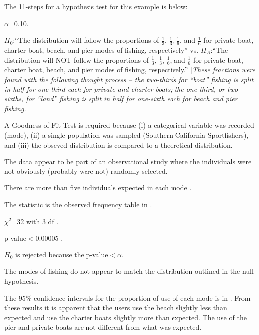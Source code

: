 \documentclass[10pt,openany]{book}\usepackage[]{graphicx}\usepackage[]{color}
\begin{document}
The 11-steps  for a hypothesis test for this example is below:
\begin{Enumerate}
  \item $\alpha$=0.10.
  \item $H_{0}$:``The distribution will follow the proportions of $\frac{1}{3}$, $\frac{1}{3}$, $\frac{1}{6}$, and $\frac{1}{6}$ for private boat, charter boat, beach, and pier modes of fishing, respectively'' vs. $H_{A}$:``The distribution will NOT follow the proportions of $\frac{1}{3}$, $\frac{1}{3}$, $\frac{1}{6}$, and $\frac{1}{6}$ for private boat, charter boat, beach, and pier modes of fishing, respectively.''  [\textit{These fractions were found with the following thought process -- the two-thirds for ``boat'' fishing is split in half for one-third each for private and charter boats; the one-third, or two-sixths, for ``land'' fishing is split in half for one-sixth each for beach and pier fishing.}]
  \item A Goodness-of-Fit Test is required because (i) a categorical variable was recorded (mode), (ii) a single population was sampled (Southern California Sportfishers), and (iii) the obseved distribution is compared to a theoretical distribution.
  \item The data appear to be part of an observational study where the individuals were not obviously (probably were not) randomly selected.
  \item There are more than five individuals expected in each mode .
  \item The statistic is the observed frequency table in .
  \item $\chi^2$=32 with 3 df .
  \item p-value$<0.00005$ .
  \item $H_{0}$ is rejected because the p-value$<\alpha$.
  \item The modes of fishing do not appear to match the distribution outlined in the null hypothesis.
  \item The 95\% confidence intervals for the proportion of use of each mode is in  . From these results it is apparent that the users use the beach slightly less than expected and use the charter boats slightly more than expected. The use of the pier and private boats are not different from what was expected.
\end{Enumerate}
\end{document}
